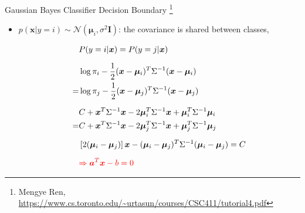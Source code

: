 \documentclass[12pt]{beamer}
\begin{document}
\begin{frame}{Gaussian Bayes Classifier Decision Boundary \footnote{\scriptsize{Mengye Ren, \url{https://www.cs.toronto.edu/~urtasun/courses/CSC411/tutorial4.pdf}}}}
\begin{itemize}
	\item $p(\bm{x}|y=i) \sim \mathcal{N}(\bm{\mu}_i,\sigma^2\mathbf{I})$: the covariance is shared between classes,
	\begin{small}
	\begin{equation} \nonumber
	\begin{aligned}
	&P(y=i|\bm{x}) = P(y=j|\bm{x}) \\[6pt]
	&\log \pi_{i} -\frac{1}{2}(\bm{x}-\bm{\mu}_i)^T \Sigma^{-1}(\bm{x}-\bm{\mu}_i) \\
	=& \log \pi_{j} -\frac{1}{2}(\bm{x}-\bm{\mu}_j)^T \Sigma^{-1}(\bm{x}-\bm{\mu}_j) \\[6pt]
	&C+\bm{x}^T\Sigma^{-1}\bm{x}-2\bm{\mu}_i^{T}\Sigma^{-1}\bm{x}+\bm{\mu}_i^{T}\Sigma^{-1}\bm{\mu}_{i} \\
	=&C+\bm{x}^T\Sigma^{-1}\bm{x}-2\bm{\mu}_j^{T}\Sigma^{-1}\bm{x}+\bm{\mu}_j^{T}\Sigma^{-1}\bm{\mu}_{j} \\[6pt]
	&\left[ 2(\bm{\mu}_i-\bm{\mu}_j) \right]\bm{x}-(\bm{\mu}_i-\bm{\mu}_j)^{T}\Sigma^{-1}(\bm{\mu}_i-\bm{\mu}_j)=C \\[6pt]
	& \textcolor{red}{\Rightarrow \bm{a}^{T}\bm{x}-b=0}
	\end{aligned}
	\end{equation}
	\end{small}
\end{itemize}
\end{frame}
\end{document}
